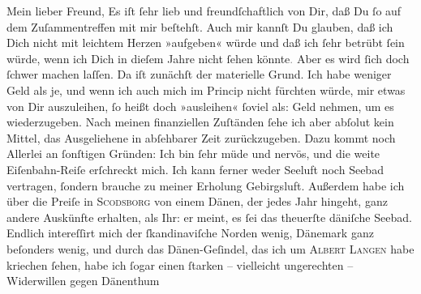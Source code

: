 \pstart{}Mein lieber Freund,\pend\vspace{0.5em}
\pstart
           Es iſt ſehr lieb und freundſchaftlich von Dir, daß Du ſo auf dem Zuſammentreffen mit
               mir beſtehſt. Auch mir kannſt Du glauben, daß ich Dich nicht mit leichtem Herzen
               »aufgeben« würde und daß ich ſehr betrübt ſein würde, wenn ich Dich in dieſem Jahre
               nicht ſehen könnte\textcolor{gray}{.} Aber es wird ſich doch ſchwer machen laſſen.
               Da iſt zunächſt der materielle Grund. Ich habe weniger Geld als je, {\pb}und wenn ich auch mich im Princip nicht  fürchten würde, mir etwas von Dir auszuleihen, ſo
               heißt doch »ausleihen« ſoviel\strikeout{,} als: Geld nehmen, um
               es wiederzugeben. Nach meinen \label{T_L02778-1v}\label{T_L02778-1} finanziellen Zuſtänden ſehe ich aber abſolut
               kein Mittel,  das Ausgeliehene in abſehbarer Zeit
               zurückzugeben. Dazu kommt noch Allerlei an ſonſtigen Gründen: Ich bin ſehr müde und
               nervös, und die weite Eiſenbahn-Reiſe erſchreckt mich. {\pb}Ich kann ferner weder Seeluft noch  Seebad vertragen, ſondern brauche zu meiner Erholung Gebirgsluft. Außerdem
               habe ich über die Preiſe in \textsc{Scodsborg} von einem Dänen, der
               jedes Jahr hingeht, ganz andere Auskünfte erhalten, als Ihr: er meint, es ſei das
               theuerſte däniſche Seebad. Endlich  intereſſirt mich der ſkandinaviſche Norden
               wenig, Dänemark ganz beſonders wenig, {\pb}und durch das Dänen-Geſindel, das ich um \textsc{Albert Langen} habe kriechen ſehen, habe ich ſogar einen ſtarken – vielleicht ungerechten –
               Widerwillen gegen Dänenthum
